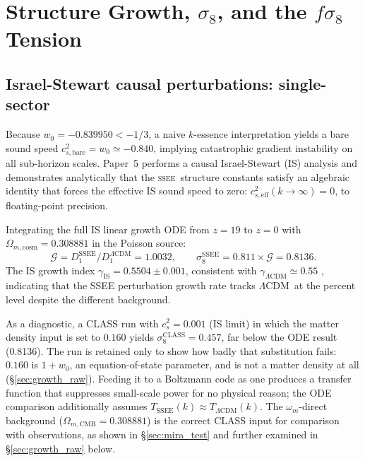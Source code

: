 \documentclass[12pt,a4paper]{article}
\newcommand{\SSEE}{\textsc{ssee}}
\newcommand{\LCDM}{$\Lambda$CDM}
\newcommand{\wz}{w_0}
\begin{document}
\section{Structure Growth, $\sigma_8$, and the $f\sigma_8$ Tension}
\label{sec:growth}

\subsection{Israel-Stewart causal perturbations: single-sector}
\label{sec:IS}

Because $\wz = -0.839950 < -1/3$, a naive $k$-essence interpretation yields
a bare sound speed $c_{s,\mathrm{bare}}^2 = \wz \simeq -0.840$, implying
catastrophic gradient instability on all sub-horizon scales.
Paper~5 \citep{AlmeidaSSEE2026P5} performs a causal Israel-Stewart (IS)
analysis \citep{IsraelStewart1979} and demonstrates analytically that the
\SSEE\ structure constants satisfy an algebraic identity that forces the
effective IS sound speed to zero:
$c_{s,\mathrm{eff}}^2(k\to\infty) = 0$, to floating-point precision.

Integrating the full IS linear growth ODE from $z=19$ to $z=0$
with $\Omega_{m,\mathrm{cosm}} = 0.308881$ in the Poisson source:
\begin{equation}
  \mathcal{G} = D_1^{\mathrm{SSEE}}/D_1^{\Lambda\mathrm{CDM}} = 1.0032,
  \qquad
  \sigma_8^{\mathrm{SSEE}} = 0.811 \times \mathcal{G} = 0.8136.
  \label{eq:G_IS}
\end{equation}
The IS growth index $\gamma_{\mathrm{IS}} = 0.5504\pm0.001$, consistent with
$\gamma_{\Lambda\mathrm{CDM}} \simeq 0.55$ \citep{Lahav1991}, indicating that
the SSEE perturbation growth rate tracks \LCDM\ at the percent level despite
the different background.

As a diagnostic, a CLASS run with $c_s^2 = 0.001$ (IS limit) in which the
matter density input is set to $0.160$ yields
$\sigma_8^{\mathrm{CLASS}} = 0.457$, far below the ODE result (0.8136).
The run is retained only to show how badly that substitution fails: $0.160$ is
$1+\wz$, an equation-of-state parameter, and is not a matter density at all
(\S\ref{sec:growth_raw}). Feeding it to a Boltzmann code as one produces a
transfer function that suppresses small-scale power for no physical reason; the
ODE comparison additionally assumes
$T_{\mathrm{SSEE}}(k) \approx T_{\Lambda\mathrm{CDM}}(k)$.
The $\omega_m$-direct background ($\Omega_{m,\mathrm{CMB}} = 0.308881$) is the correct CLASS input for comparison
with observations, as shown in \S\ref{sec:mira_test} and further examined in
\S\ref{sec:growth_raw} below.
\end{document}
